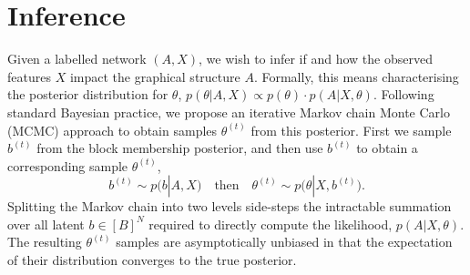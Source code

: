 \section{Inference}
\label{sec:inference}

Given a labelled network $(A, X)$, we wish to infer if and how the observed features $X$ impact the graphical structure $A$. Formally,
this means characterising the posterior distribution for $\theta$,
$
p(\theta|A, X) \propto p(\theta) \cdot p(A | X, \theta).
$
Following standard Bayesian practice,
we propose an iterative Markov chain Monte Carlo
(MCMC) approach to obtain 
samples $\theta^{(t)}$ from this posterior.
First we sample $b^{(t)}$ 
from the block membership posterior,
and then use $b^{(t)}$ to obtain a corresponding
sample $\theta^{(t)}$,
%
\begin{equation}
	b^{(t)} \sim p \big( b | A, X \big) 
	\quad \textrm{then} \quad
	\theta^{(t)}\sim
	p\big(\theta | X, b^{(t)} \big).
\end{equation}
%
Splitting the Markov chain into two levels side-steps the intractable summation over
all latent $b \in [B]^N$ required to directly compute the likelihood, $p(A| X, \theta)$.
The resulting $\theta^{(t)}$ samples are asymptotically
unbiased in that the expectation of 
their distribution converges to the true posterior.
%
